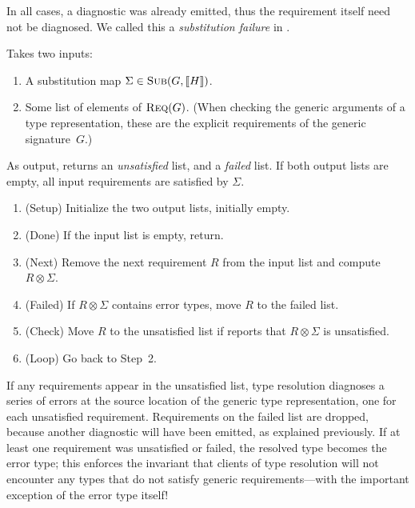 \documentclass[../generics]{subfiles}
\begin{document}
In all cases, a diagnostic was already emitted, thus the requirement itself need not be diagnosed. We called this a \emph{substitution failure} in .
\begin{algorithm}\label{check generic arguments algorithm}
Takes two inputs:
\begin{enumerate}
\item A substitution map $\Sigma\in\textsc{Sub}({G, [\![H]\!]})$.
\item Some list of elements of $\textsc{Req}({G})$. (When checking the generic arguments of a type representation, these are the explicit requirements of the generic signature~$G$.)
\end{enumerate}
As output, returns an \emph{unsatisfied} list, and a \emph{failed} list. If both output lists are empty, all input requirements are satisfied by $\Sigma$.
\begin{enumerate}
\item (Setup) Initialize the two output lists, initially empty.
\item (Done) If the input list is empty, return.
\item (Next) Remove the next requirement $R$ from the input list and compute $R\otimes\Sigma$.
\item (Failed) If $R\otimes\Sigma$ contains error types, move $R$ to the failed list.
\item (Check) Move $R$ to the unsatisfied list if  reports that $R\otimes\Sigma$ is unsatisfied.
\item (Loop) Go back to Step~2.
\end{enumerate}
\end{algorithm}
If any requirements appear in the unsatisfied list, type resolution diagnoses a series of errors at the source location of the generic type representation, one for each unsatisfied requirement. Requirements on the failed list are dropped, because another diagnostic will have been emitted, as explained previously. If at least one requirement was unsatisfied or failed, the resolved type becomes the error type; this enforces the invariant that clients of type resolution will not encounter any types that do not satisfy generic requirements---with the important exception of the error type itself!
\end{document}
